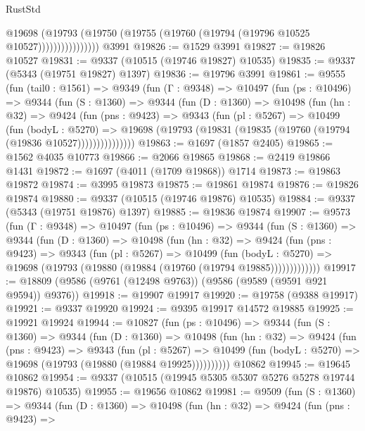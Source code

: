 \begin{lexlean}{RustStd}
\begin{coremodule}
                      @19698
                        (@19793
                          (@19750 (@19755 (@19760 (@19794 (@19796 @10525 @10527))))))))))))))))
    @3991
@19826 := @1529 @3991
@19827 := @19826 @10527
@19831 := @9337 (@10515 (@19746 @19827) @10535)
@19835 := @9337 (@5343 (@19751 @19827) @1397)
@19836 := @19796 @3991
@19861 := @9555
    (fun (tail0 : @1561) =>
    @9349
      (fun (Γ : @9348) =>
      @10497
        (fun (ps : @10496) =>
        @9344
          (fun (S : @1360) =>
          @9344
            (fun (D : @1360) =>
            @10498
              (fun (hn : @32) =>
              @9424
                (fun (pns : @9423) =>
                @9343
                  (fun (pl : @5267) =>
                  @10499
                    (fun (bodyL : @5270) =>
                    @19698 (@19793 (@19831 (@19835 (@19760 (@19794 (@19836 @10527)))))))))))))))
@19863 := @1697 (@1857 @2405)
@19865 := @1562 @4035 @10773
@19866 := @2066 @19865
@19868 := @2419 @19866 @1431
@19872 := @1697 (@4011 (@1709 @19868)) @1714
@19873 := @19863 @19872
@19874 := @3995 @19873
@19875 := @19861 @19874
@19876 := @19826 @19874
@19880 := @9337 (@10515 (@19746 @19876) @10535)
@19884 := @9337 (@5343 (@19751 @19876) @1397)
@19885 := @19836 @19874
@19907 := @9573
    (fun (Γ : @9348) =>
    @10497
      (fun (ps : @10496) =>
      @9344
        (fun (S : @1360) =>
        @9344
          (fun (D : @1360) =>
          @10498
            (fun (hn : @32) =>
            @9424
              (fun (pns : @9423) =>
              @9343
                (fun (pl : @5267) =>
                @10499
                  (fun (bodyL : @5270) =>
                  @19698 (@19793 (@19880 (@19884 (@19760 (@19794 @19885)))))))))))))
@19917 := @18809 (@9586 (@9761 (@12498 @9763)) (@9586 (@9589 (@9591 @921 @9594)) @9376))
@19918 := @19907 @19917
@19920 := @19758 (@9388 @19917)
@19921 := @9337 @19920
@19924 := @9395 @19917 @14572 @19885
@19925 := @19921 @19924
@19944 := @10827
    (fun (ps : @10496) =>
    @9344
      (fun (S : @1360) =>
      @9344
        (fun (D : @1360) =>
        @10498
          (fun (hn : @32) =>
          @9424
            (fun (pns : @9423) =>
            @9343
              (fun (pl : @5267) =>
              @10499 (fun (bodyL : @5270) => @19698 (@19793 (@19880 (@19884 @19925))))))))))
    @10862
@19945 := @19645 @10862
@19954 := @9337 (@10515 (@19945 @5305 @5307 @5276 @5278 @19744 @19876) @10535)
@19955 := @19656 @10862
@19981 := @9509
    (fun (S : @1360) =>
    @9344
      (fun (D : @1360) =>
      @10498
        (fun (hn : @32) =>
        @9424
          (fun (pns : @9423) =>

\end{coremodule}
\end{lexlean}
